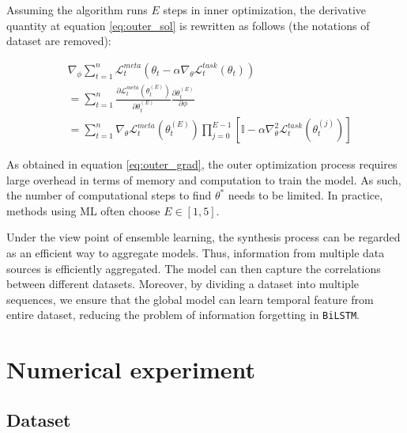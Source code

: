 \documentclass[a4paper,fleqn]{cas-sc}
\begin{document}
\vspace{1mm}

Assuming the algorithm runs $E$ steps in inner optimization, the derivative quantity at equation \ref{eq:outer_sol} is rewritten as follows (the notations of dataset are removed):

\begin{align}
    &\nabla_{\phi} \sum_{t=1}^n{\mathcal{L}^{meta}_t \left( \theta_t - \alpha \nabla_{\theta} \mathcal{L}^{task}_t\left( \theta_t \right) \right)}\\
    &= \sum_{t=1}^n{ \frac{\partial \mathcal{L}^{meta}_t\left(\theta_t^{(E)}\right)}{\partial \theta_t^{(E)}} \frac{\partial \theta_t^{(E)}}{\partial \phi}}\\
    &= \sum_{t=1}^n{ \nabla_{\theta} \mathcal{L}^{meta}_t\left(\theta_t^{(E)}\right) \prod_{j=0}^{E-1} {\left[\mathbb{I} - \alpha\nabla^2_{\theta}\mathcal{L}^{task}_{t}\left(\theta_t^{(j)}\right)\right]}}
    \label{eq:outer_grad}
\end{align}

As obtained in equation \ref{eq:outer_grad}, the outer optimization process requires large overhead in terms of memory and computation to train the model. As such, the number of computational steps to find $\theta^*$ needs to be limited. In practice, methods using ML \cite{chen2018federated, fallah2020personalized, finn2017model, li2017meta, nguyen2022meta} often choose $E\in [1,5]$.

\vspace{1mm}

Under the view point of ensemble learning, the synthesis process can be regarded as an efficient way to aggregate models. Thus, information from multiple data sources is efficiently aggregated. The model can then capture the correlations between different datasets. Moreover, by dividing a dataset into multiple sequences, we ensure that the global model can learn temporal feature from entire dataset, reducing the problem of information forgetting in \verb|BiLSTM|.

\section{Numerical experiment}

\subsection{Dataset}
\end{document}
